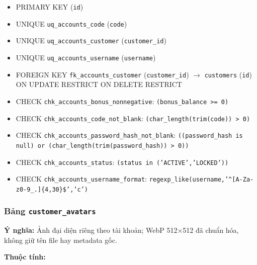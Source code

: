 \begin{itemize}

\item PRIMARY KEY (\texttt{id})

\item UNIQUE \texttt{uq\_accounts\_code} (\texttt{code})

\item UNIQUE \texttt{uq\_accounts\_customer} (\texttt{customer\_id})

\item UNIQUE \texttt{uq\_accounts\_username} (\texttt{username})

\item FOREIGN KEY \texttt{fk\_accounts\_customer} (\texttt{customer\_id}) $\rightarrow$ \texttt{customers} (\texttt{id}) ON UPDATE RESTRICT ON DELETE RESTRICT

\item CHECK \texttt{chk\_accounts\_bonus\_nonnegative}: \texttt{(bonus\_balance >= 0)}

\item CHECK \texttt{chk\_accounts\_code\_not\_blank}: \texttt{(char\_length(trim(code)) > 0)}

\item CHECK \texttt{chk\_accounts\_password\_hash\_not\_blank}: \texttt{((password\_hash is null) or (char\_length(trim(password\_hash)) > 0))}

\item CHECK \texttt{chk\_accounts\_status}: \texttt{(status in ('ACTIVE','LOCKED'))}

\item CHECK \texttt{chk\_accounts\_username\_format}: \texttt{regexp\_like(username,'^[A-Za-z0-9\_.]\{4,30\}\$','c')}

\end{itemize}

\subsubsection{Bảng \texttt{customer\_avatars}}

\textbf{Ý nghĩa:} Ảnh đại diện riêng theo tài khoản; WebP 512×512 đã chuẩn hóa, không giữ tên file hay metadata gốc.\par

\textbf{Thuộc tính:}

